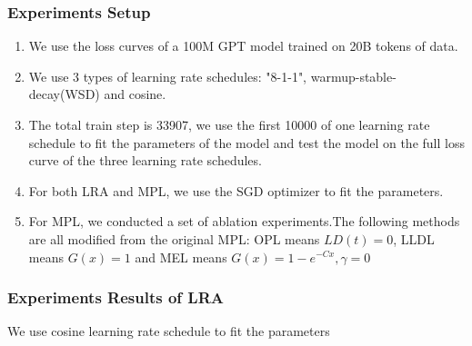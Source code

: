 \documentclass[aspectratio=169]{beamer}
\begin{document}
    \begin{frame}
        \frametitle{Experiments Setup}
        \begin{enumerate}
            \item We use the loss curves of a 100M GPT model trained on
            20B tokens of data.
            \item We use 3 types of learning rate schedules: "8-1-1",
            warmup-stable-decay(WSD) and cosine.
            \item The total train step is 33907, we use the first 10000
            of one learning rate schedule to fit the parameters of
            the model and test the model on the full loss curve of
            the three learning rate schedules.
            \item For both LRA and MPL, we use the SGD optimizer to fit
            the parameters.
            \item For MPL, we conducted a set of ablation experiments.The
            following methods are all
            modified from the original MPL: OPL means $LD(t)=0$, LLDL
            means $G(x)=1$ and MEL means $G(x) = 1-e^{-Cx},\gamma = 0$
        \end{enumerate}
    \end{frame}

    \begin{frame}
        \frametitle{Experiments Results of LRA}
        We use cosine learning rate schedule to fit the parameters
        \begin{figure}
            \centering
            \label{fig:figure}
        \end{figure}
    \end{frame}
\end{document}
